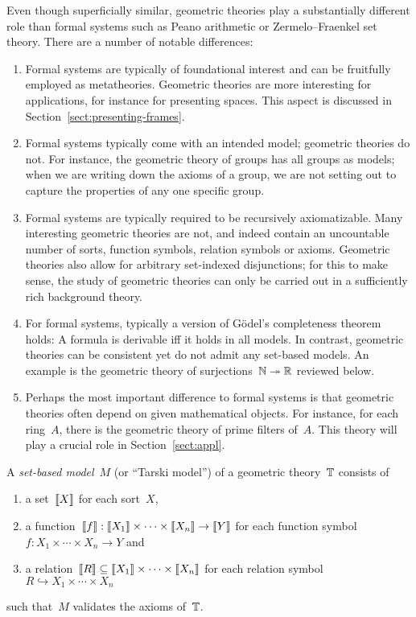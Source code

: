\documentclass{ws-rv9x6}
\begin{document}
{{\begin{table}[t]
{\begin{minipage}{0.8\textwidth}
  \end{minipage}}
  \label{table:first-order-logic}
\end{table}}

Even though superficially similar, geometric theories play a
substantially different role than formal systems such as Peano arithmetic or
Zermelo--Fraenkel set theory. There are a number of notable differences:
\begin{enumerate}
\item Formal systems are typically of foundational interest and can be
fruitfully employed as metatheories. Geometric theories are more interesting
for applications, for instance for presenting spaces. This aspect is discussed
in Section~\ref{sect:presenting-frames}.
\item Formal systems typically come with an intended model; geometric theories
do not. For instance, the geometric theory of groups has all groups as models;
when we are writing down the axioms of a group, we are not setting out to
capture the properties of any one specific group.
\item Formal systems are typically required to be recursively
axiomatizable. Many interesting geometric theories are not, and indeed contain
an uncountable number of sorts, function symbols, relation symbols or axioms. Geometric theories also allow for arbitrary
set-indexed disjunctions; for this to make sense, the study of geometric
theories can only be carried out in a sufficiently rich background theory.
\item For formal systems, typically a version of Gödel's completeness theorem
holds: A formula is derivable iff it holds in all models. In contrast,
geometric theories can be consistent yet do not admit any set-based models. An
example is the geometric theory of surjections~$\mathbb{N} \twoheadrightarrow \mathbb{R}$
reviewed below.
\item Perhaps the most important difference to formal systems is that geometric
theories often depend on given mathematical objects. For instance, for each
ring~$A$, there is the geometric theory of prime filters of~$A$. This theory
will play a crucial role in Section~\ref{sect:appl}.
\end{enumerate}

\begin{definition}A \emph{set-based model}~$M$ (or ``Tarski model'') of a
geometric theory~$\mathbb{T}$ consists of
\begin{enumerate}
  \item a set~${\llbracket{X}\rrbracket}$ for each sort~$X$,
  \item a function~${\llbracket{f}\rrbracket} : {\llbracket{X_1}\rrbracket} \times \cdots \times {\llbracket{X_n}\rrbracket} \to
  {\llbracket{Y}\rrbracket}$
  for each function symbol~$f : X_1 \times \cdots \times X_n \to Y$ and
  \item a relation~${\llbracket{R}\rrbracket} \subseteq {\llbracket{X_1}\rrbracket} \times \cdots \times {\llbracket{X_n}\rrbracket}$
  for each relation symbol~$R \hookrightarrow X_1 \times \cdots \times X_n$
\end{enumerate}
such that~$M$ validates the axioms of~$\mathbb{T}$.
\end{definition}

}
\end{document}
